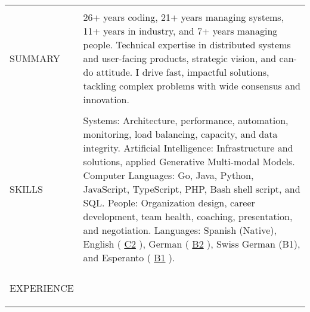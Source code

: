 \documentclass[letterpaper,10pt,oneside]{article}
\newcommand{\sref}[2]{%
    \href{https://0/local/attachments/#1}{\textcolor{hiddenblue}{#2}}%
}
\newenvironment{body}
{\par\par
\begin{longtable}{p{0.145\textwidth}p{0.81\textwidth}}}
{\par\end{longtable}\par}
\renewcommand{\section}[3]{\\[-1.1cm]\pdfbookmark[2]{#2}{#3}\\%
\raggedleft  %
{\fontsize{9.5pt}{9.5pt}\selectfont\bfseries\raggedright%
\MakeUppercase{#1}}&}
\begin{document}
\begin{body}


\section{Summary}{Summary}{PDF:Summary}

26+ years coding, 21+ years managing systems, 11+ years in industry, and 7+ years managing people.\newline
Technical expertise in distributed systems and user-facing products, strategic vision, and can-do attitude.\newline
I drive fast, impactful solutions, tackling complex problems with wide consensus and innovation.


\section{Skills}{Skills}{PDF:Skills}
Systems: Architecture, performance, automation, monitoring, load balancing, capacity, and data integrity.\newline
Artificial Intelligence: Infrastructure and solutions, applied Generative Multi-modal Models.\newline
Computer Languages: Go, Java, Python, JavaScript, TypeScript, PHP, Bash shell script, and SQL.\newline
People: Organization design, career development, team health, coaching, presentation, and negotiation.\newline
Languages: Spanish (Native), English (\sref{Diploma-ESOLCPE.pdf}{C2}), German (\sref{Diploma-GoetheDeutsch-B2.pdf}{B2}), Swiss German (B1), and Esperanto (\sref{Diploma-EAB-Esperanto-Meznivela.pdf}{B1}).


\section{Experience}{Experience}{PDF:Experience}


\end{body}
\end{document}
